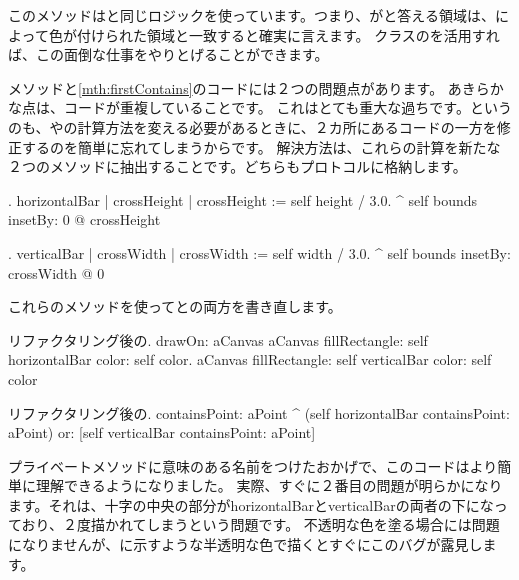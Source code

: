 \documentclass[a4paper,10pt,twoside]{book}
\begin{document}
このメソッドはと同じロジックを使っています。つまり、がと答える領域は、によって色が付けられた領域と一致すると確実に言えます。
クラスのを活用すれば、この面倒な仕事をやりとげることができます。

メソッドと\ref{mth:firstContains}のコードには２つの問題点があります。
あきらかな点は、コードが重複していることです。
これはとても重大な過ちです。というのも、やの計算方法を変える必要があるときに、２カ所にあるコードの一方を修正するのを簡単に忘れてしまうからです。
解決方法は、これらの計算を新たな２つのメソッドに抽出することです。どちらもプロトコルに格納します。

\begin{method}{.}
horizontalBar
	| crossHeight |
	crossHeight := self height / 3.0.
	^ self bounds insetBy: 0 @ crossHeight
\end{method}

\begin{method}{.}
verticalBar
	| crossWidth |
	crossWidth := self width / 3.0.
	^ self bounds insetBy: crossWidth @ 0
\end{method}

\noindent
これらのメソッドを使ってとの両方を書き直します。

\begin{method}{リファクタリング後の.}
drawOn: aCanvas 
	aCanvas fillRectangle: self horizontalBar color: self color.
	aCanvas fillRectangle: self verticalBar color: self color
\end{method}

\begin{method}{リファクタリング後の.}
containsPoint: aPoint 
	^ (self horizontalBar containsPoint: aPoint)
		or: [self verticalBar containsPoint: aPoint]
\end{method}

プライベートメソッドに意味のある名前をつけたおかげで、このコードはより簡単に理解できるようになりました。
実際、すぐに２番目の問題が明らかになります。それは、十字の中央の部分がhorizontalBarとverticalBarの両者の下になっており、２度描かれてしまうという問題です。
不透明な色を塗る場合には問題になりませんが、に示すような半透明な色で描くとすぐにこのバグが露見します。
\end{document}
